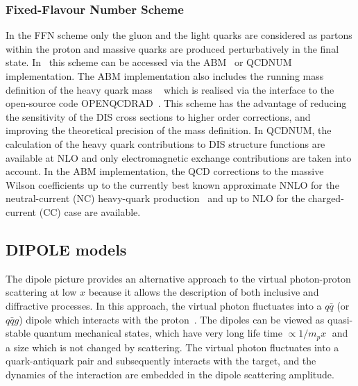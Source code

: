\subsubsection {Fixed-Flavour Number Scheme}

In the FFN scheme only the gluon and the light quarks are considered
as partons within the proton and massive quarks are produced perturbatively in the final state.
In \fitter\ this scheme can be accessed via the ABM~\cite{openqcdrad:page} or
QCDNUM implementation.
The ABM implementation also includes the running mass definition of the heavy quark 
mass ~\cite{Alekhin:runm} which is realised via the interface to the 
open-source code OPENQCDRAD~\cite{openqcdrad:page}.
This scheme has the advantage of reducing the sensitivity of the DIS cross sections to
higher order corrections, and improving the theoretical precision of the mass definition. 
In QCDNUM, the calculation of the heavy quark contributions to DIS structure functions
are available at NLO and only electromagnetic exchange contributions are taken into account.
In the ABM implementation, the QCD corrections to the massive Wilson coefficients 
up to the currently best known approximate NNLO for the neutral-current (NC) 
heavy-quark production~\cite{SMoch:npb864} and up to NLO
for the charged-current (CC) case are available.
%
\subsection{DIPOLE models}

The dipole picture provides an alternative approach to the virtual photon-proton
 scattering at low $x$  because it allows the description of both inclusive and 
diffractive processes.
 In this approach, the virtual photon fluctuates into a $q\bar q$ (or $q\bar q g$) 
 dipole which interacts with the proton~\cite{NNZ:91}.  
The dipoles can be viewed as quasi-stable quantum mechanical states, which have very long 
life time $\propto 1/m_p x\;$ and a size which is not changed by scattering.
The virtual photon fluctuates into a quark-antiquark pair and subsequently interacts with the target, 
and the dynamics of the interaction are embedded in the dipole scattering amplitude.


